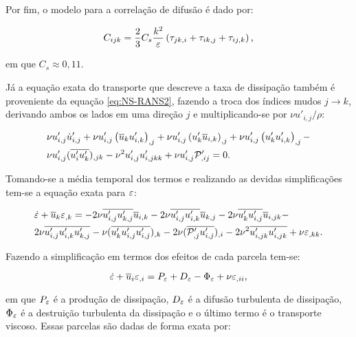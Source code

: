 \documentclass[_ArquivoPrincipal.tex]{subfiles}
\begin{document}
Por fim, o modelo para a correlação de difusão é dado por:

\begin{equation}
    C_{ijk}=\frac{2}{3}C_s\frac{k^2}{\varepsilon}\left({\tau_{jk,i}+\tau_{ik,j}+\tau_{ij,k}}\right)\text{,}
\end{equation}

\noindent em que $C_s\approx0,11$.

Já a equação exata do transporte que descreve a taxa de dissipação também é proveniente da equação \ref{eq:NS-RANS2}, fazendo a troca dos índices mudos $j\to k$, derivando ambos os lados em uma direção $j$ e multiplicando-se por $\nu u'_{i,j}/\rho$:

\begin{equation}
    \begin{split}
        &\nu u'_{i,j}\dot{u}'_{i,j}+\nu u'_{i,j}\left({\overline{u}_ku'_{i,k}}\right)_{,j}+\nu u'_{i,j}\left({u'_k\overline{u}_{i,k}}\right)_{,j}+\nu u'_{i,j}\left({u'_ku'_{i,k}}\right)_{,j}-\\
        &\nu u'_{i,j}(\overline{u'_iu'_k})_{,jk}-\nu^2u'_{i,j}u'_{i,jkk}+\nu u'_{i,j}\mathcal{P}'_{,ij}=0\text{.}
    \end{split}
\end{equation}

Tomando-se a média temporal dos termos e realizando as devidas simplificações tem-se a equação exata para $\varepsilon$:

\begin{equation}
    \begin{split}
        &\dot{\varepsilon}+\overline{u}_k\varepsilon_{,k}=-2\nu\overline{u'_{i,j}u'_{k,j}}\overline{u}_{i,k}-2\nu\overline{u'_{i,j}u'_{i,k}}\overline{u}_{k,j}-2\nu\overline{u'_ku'_{i,j}}\overline{u}_{i,jk}-\\
        &2\nu\overline{u'_{i,j}u'_{i,k}u'_{k,j}}-\nu(\overline{u'_ku'_{i,j}u'_{i,j}})_{,k}-2\nu(\overline{\mathcal{P}'_{,j}u'_{i,j}})_{,i}-2\nu^2\overline{u'_{i,jk}u'_{i,jk}}+\nu\varepsilon_{,kk}\text{.}
    \end{split}
\end{equation}

Fazendo a simplificação em termos dos efeitos de cada parcela tem-se:

\begin{equation}
    \dot{\varepsilon}+\overline{u}_i\varepsilon_{,i}=P_\varepsilon+D_\varepsilon-\Phi_\varepsilon+\nu\varepsilon_{,ii}\text{,}
\end{equation}

\noindent em que $P_\varepsilon$ é a produção de dissipação, $D_\varepsilon$ é a difusão turbulenta de dissipação, $\Phi_\varepsilon$ é a destruição turbulenta da dissipação e o último termo é o transporte viscoso. Essas parcelas são dadas de forma exata por:
\end{document}
